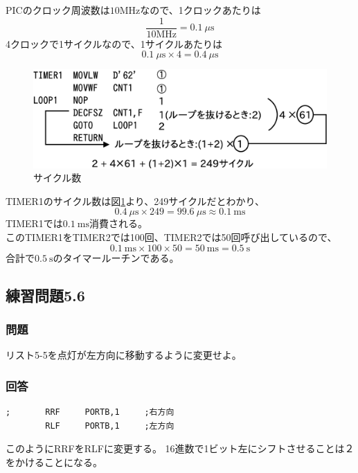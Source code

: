 \documentclass[a4paper,12pt]{ujarticle}
\begin{document}
  PICのクロック周波数は$10\si{\mega\hertz}$なので、1クロックあたりは
    \[
     \frac{1}{10\si{\mega\hertz}} = \SI{0.1}{\mu\second}
    \]
    4クロックで1サイクルなので、1サイクルあたりは
    \[
     \SI{0.1}{\mu\second} \times 4 = \SI{0.4}{\mu\second}
    \]
     \begin{figure}[htbp]
      \begin{center}
       \includegraphics[width=130mm]{Diagram5.eps}
      \end{center}
      \caption{サイクル数}
      \label{fig:sicle}
     \end{figure}
     TIMER1のサイクル数は図\ref{fig:sicle}より、249サイクルだとわかり、
     \[
      \SI{0.4}{\mu\second} \times 249 = \SI{99.6}{\mu\second} \approx \SI{0.1}{\milli\second}
     \]
     TIMER1では$\SI{0.1}{\milli\second}$消費される。\\
     このTIMER1をTIMER2では100回、TIMER2では50回呼び出しているので、
     \[
      \SI{0.1}{\milli\second} \times 100 \times 50 = \SI{50}{\milli\second} = \SI{0.5}{\second}
     \]
     合計で$\SI{0.5}{\second}$のタイマールーチンである。
  \subsection{練習問題5.6}
     \subsubsection{問題}
     リスト5-5を点灯が左方向に移動するように変更せよ。
     \subsubsection{回答}
  \begin{lstlisting}[basicstyle=\ttfamily\footnotesize, frame=single]
;       RRF     PORTB,1     ;右方向
        RLF     PORTB,1     ;左方向
  \end{lstlisting}
  このようにRRFをRLFに変更する。
  16進数で1ビット左にシフトさせることは２をかけることになる。
\end{document}
